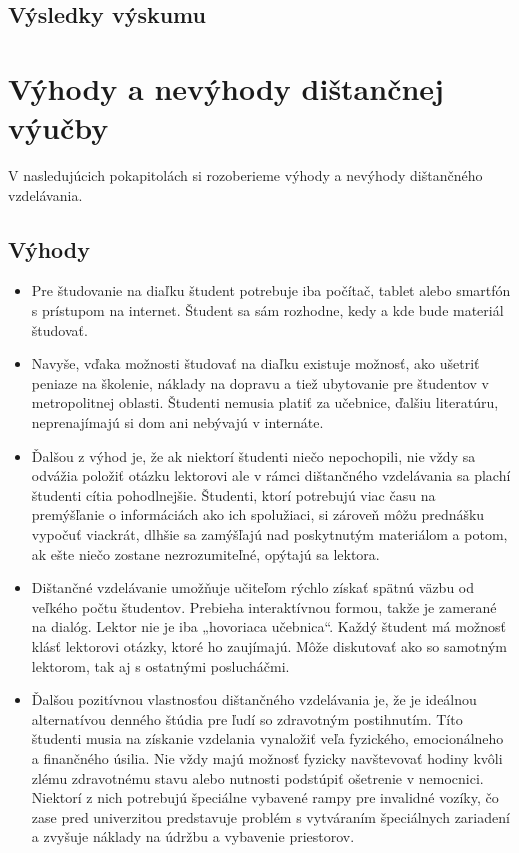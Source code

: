 \documentclass[10pt,oneside,slovak,a4paper]{article}
\begin{document}
\subsection{Výsledky výskumu}


\section{Výhody a nevýhody dištančnej výučby}
V nasledujúcich pokapitolách si rozoberieme výhody a nevýhody dištančného vzdelávania\cite{Sokolova2018}. 
\subsection{Výhody}
\begin{itemize}
	\item Pre študovanie na diaľku študent potrebuje iba počítač, tablet alebo smartfón s prístupom na internet. Študent sa sám rozhodne, kedy a kde bude materiál študovať.
	\item Navyše, vďaka možnosti študovať na diaľku existuje možnosť, ako ušetriť peniaze na školenie, náklady na dopravu a tiež ubytovanie pre študentov v metropolitnej oblasti.
	Študenti nemusia platiť za učebnice, ďalšiu literatúru, neprenajímajú si dom ani nebývajú v internáte.
	\item Ďalšou z výhod je, že ak niektorí študenti niečo nepochopili, nie vždy sa odvážia položiť otázku lektorovi ale v rámci dištančného vzdelávania sa plachí študenti cítia pohodlnejšie.
	Študenti, ktorí potrebujú viac času na premýšľanie o informáciách ako ich spolužiaci, si zároveň môžu prednášku vypočuť viackrát, dlhšie sa zamýšľajú nad poskytnutým materiálom a potom, ak ešte niečo zostane nezrozumiteľné, opýtajú sa lektora.
	\item Dištančné vzdelávanie umožňuje učiteľom rýchlo získať spätnú väzbu od veľkého počtu študentov. Prebieha interaktívnou formou, takže je zamerané na dialóg.
	Lektor nie je iba „hovoriaca učebnica“. Každý študent má možnosť klásť lektorovi otázky, ktoré ho zaujímajú. Môže diskutovať ako so samotným lektorom, tak aj s ostatnými poslucháčmi.
	\item Ďalšou pozitívnou vlastnosťou dištančného vzdelávania je, že je ideálnou alternatívou denného štúdia pre ľudí so zdravotným postihnutím.
	Títo študenti musia na získanie vzdelania vynaložiť veľa fyzického, emocionálneho a finančného úsilia.
	Nie vždy majú možnosť fyzicky navštevovať hodiny kvôli zlému zdravotnému stavu alebo nutnosti podstúpiť ošetrenie v nemocnici.
	Niektorí z nich potrebujú špeciálne vybavené rampy pre invalidné vozíky, čo zase pred univerzitou predstavuje problém s vytváraním špeciálnych zariadení a zvyšuje náklady na údržbu a vybavenie priestorov.
\end{itemize}
\end{document}
